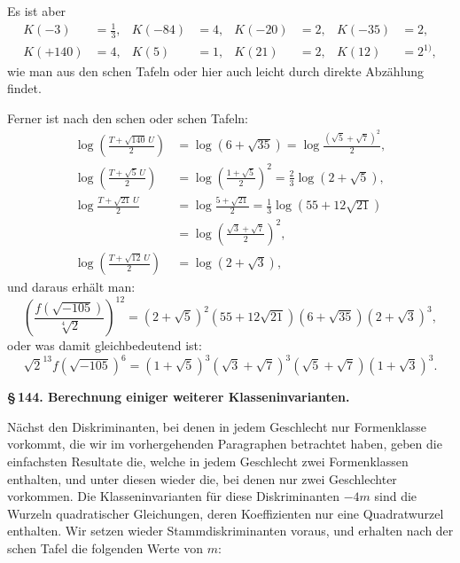 Es ist aber
\[
\begin{aligned}
K(-3) &= \tfrac{1}{3}, & K(-84) &= 4, & K(-20) &= 2, & K(-35) &= 2, \\
K(+140) &= 4, & K(5) &= 1, & K(21) &= 2, & K(12) &= 2^{1)},
\end{aligned}
\]
\begingroup\renewcommand{\thefootnote}{1)}\endgroup
wie man aus den schen Tafeln oder hier auch leicht durch direkte Abzählung findet.

Ferner ist nach den schen oder schen Tafeln:
\[
\begin{aligned}
\log\left(\frac{T+\sqrt{140}\,U}{2}\right) &= \log(6+\sqrt{35}) = \log\frac{(\sqrt{5}+\sqrt{7})^2}{2}, \\
\log\left(\frac{T+\sqrt{5}\,U}{2}\right) &= \log\left(\frac{1+\sqrt{5}}{2}\right)^2 = \tfrac{2}{3}\log(2+\sqrt{5}), \\
\log\frac{T+\sqrt{21}\,U}{2} &= \log\frac{5+\sqrt{21}}{2} = \tfrac{1}{3}\log(55+12\sqrt{21}) \\
&= \log\left(\frac{\sqrt{3}+\sqrt{7}}{2}\right)^2, \\
\log\left(\frac{T+\sqrt{12}\,U}{2}\right) &= \log(2+\sqrt{3}),
\end{aligned}
\]
und daraus erhält man:
\[
\left(\frac{f(\sqrt{-105})}{\sqrt[4]{2}}\right)^{12} = (2+\sqrt{5})^2(55+12\sqrt{21})(6+\sqrt{35})(2+\sqrt{3})^3,
\]
oder was damit gleichbedeutend ist:
\[
\sqrt{2}^{13}f(\sqrt{-105})^6 = (1+\sqrt{5})^3(\sqrt{3}+\sqrt{7})^3(\sqrt{5}+\sqrt{7})(1+\sqrt{3})^3.
\]

\begin{center}
\textbf{\S\,144. Berechnung einiger weiterer Klasseninvarianten.}
\end{center}

Nächst den Diskriminanten, bei denen in jedem Geschlecht nur  Formenklasse vorkommt, die wir im vorhergehenden Paragraphen betrachtet haben, geben die einfachsten Resultate die, welche in jedem Geschlecht zwei Formenklassen enthalten, und unter diesen wieder die, bei denen nur zwei Geschlechter vorkommen. Die Klasseninvarianten für diese Diskriminanten $-4m$ sind die Wurzeln quadratischer Gleichungen, deren Koeffizienten nur eine Quadratwurzel enthalten. Wir setzen wieder Stammdiskriminanten voraus, und erhalten nach der schen Tafel die folgenden Werte von $m$:
